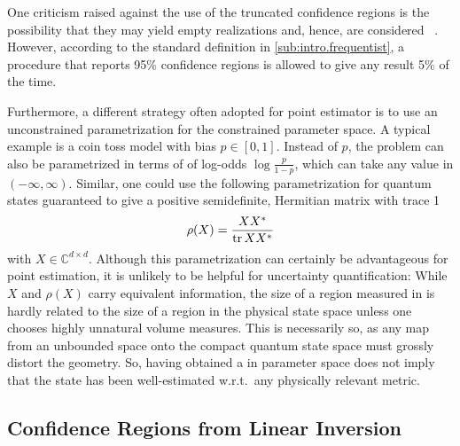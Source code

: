 One criticism raised against the use of the truncated confidence regions is the possibility that they may yield empty realizations and, hence, are considered ~\cite{Feldman_1998_Unified}.
However, according to the standard definition in \cref{sub:intro.frequentist}, a procedure that reports 95\% confidence regions is allowed to give any result 5\% of the time.

Furthermore, a different strategy often adopted for point estimator is to use an unconstrained parametrization for the constrained parameter space.
A typical example is a coin toss model with bias $p \in [0, 1]$.
Instead of $p$, the problem can also be parametrized in terms of of log-odds $\log\frac{p}{1 - p}$, which can take any value in $(-\infty,\infty)$.
Similar, one could use the following parametrization for quantum states guaranteed to give a positive semidefinite, Hermitian matrix with trace 1
\[
  \rho(X) = \frac{X {X}^\ast}{\operatorname{tr} X {X}^\ast}
\]
with $X \in \mathbb{C}^{d \times d}$.
Although this parametrization can certainly be advantageous for point estimation, it is unlikely to be helpful for uncertainty quantification:
While $X$ and $\rho(X)$ carry equivalent information, the size of a region measured in  is hardly related to the size of a region in the physical state space unless one chooses highly unnatural volume measures.
This is necessarily so, as any map from an unbounded space onto the compact quantum state space must grossly distort the geometry.
So, having obtained a  in parameter space does not imply that the state has been well-estimated w.r.t.\ any physically relevant metric.

\subsection{Confidence Regions from Linear Inversion}
\label{sub:ortho.linear_inversion}

